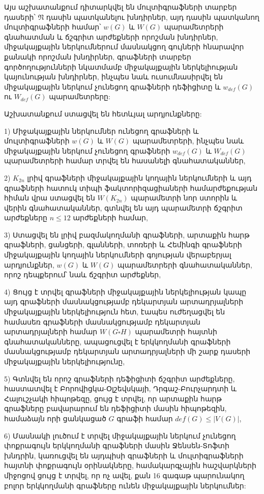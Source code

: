 Այս աշխատանքում դիտարկվել են մուլտիգրաֆների տարբեր դասերի՝ $\mathfrak{N}$ դասին պատկանելու խնդիրներ, այդ դասին պատկանող մուլտիգրաֆների համար՝ $w(G)$ և $W(G)$ պարամետրերի գնահատման և ճշգրիտ արժեքների որոշման խնդիրներ, միջակայքային ներկումներում մասնակցող գույների հնարավոր քանակի որոշման խնդիրներ, գրաֆների տարբեր գործողությունների նկատմամբ միջակայքային ներկելիության կայունության խնդիրներ, ինչպես նաև ուսումնասիրվել են միջակայքային ներկում չունեցող գրաֆների դեֆիցիտը և $w_{def}(G)$ ու $W_{def}(G)$ պարամետրերը:

Աշխատանքում ստացվել են հետևյալ արդյունքները:

1) Միջակայքային ներկումներ ունեցող գրաֆների և մուլտիգրաֆների $w(G)$ և $W(G)$ պարամետրերի, ինչպես նաև միջակայքային ներկում չունեցող գրաֆների $w_{def}(G)$ և $W_{def}(G)$ պարամետրերի համար տրվել են հասանելի գնահատականներ,

2) $K_{2n}$ լրիվ գրաֆների միջակայքային կողային ներկումների և այդ գրաֆների հատուկ տիպի ֆակտորիզացիաների համարժեքության հիման վրա ստացվել են  $W(K_{2n})$ պարամետրի նոր ստորին և վերին գնահատականներ, գտնվել են այդ պարամետրի ճշգրիտ արժեքները $n \leq 12$ արժեքների համար,

3) Ստացվել են լրիվ բազմակողմանի գրաֆների, արտաքին հարթ գրաֆների, ցանցերի, գլանների, տոռերի և Հեմինգի գրաֆների միջակայքային կողային ներկումների գոյության վերաբերյալ արդյունքներ, $w(G)$ և $W(G)$ պարամետրերի գնահատականներ, որոշ դեպքերում՝ նաև ճշգրիտ արժեքներ,

4) Ցույց է տրվել գրաֆների միջակայքային ներկելիության կապը այդ գրաֆների մասնակցությամբ դեկարտյան արտադրյալների միջակայքային ներկելիություն հետ, էապես ուժեղացվել են համասեռ գրաֆների մասնակցությամբ դեկարտյան արտադրյալների համար $W(G \square H)$ պարամետրի հայտնի գնահատականները, ապացուցվել է երկկողմանի գրաֆների մասնակցությամբ դեկարտյան արտադրյալների մի շարք դասերի միջակայքային ներկելիությունը,

5) Գտնվել են որոշ գրաֆների դեֆիցիտի ճշգրիտ արժեքները, հաստատվել է Բորովիցկա-Օլշեվսկայի, Դրգաշ-Բուրչարդտի և Հալուշչակի հիպոթեզը, ցույց է տրվել, որ արտաքին հարթ գրաֆները բավարարում են դեֆիցիտի մասին հիպոթեզին, համաձայն որի ցանկացած $G$ գրաֆի համար $def(G) \leq |V(G)|$,

6) Մասնակի լուծում է տրվել միջակայքային ներկում չունեցող փոքրագույն երկկողմանի գրաֆների մասին Ջենսեն-Տոֆտի խնդրին, կառուցվել են այդպիսի գրաֆների և մուլտիգրաֆների հայտնի փոքրագույն օրինակները, համակարգչային հաշվարկների միջոցով ցույց է տրվել, որ ոչ ավել, քան 16 գագաթ պարունակող բոլոր երկկողմանի գրաֆները ունեն միջակայքային ներկումներ: